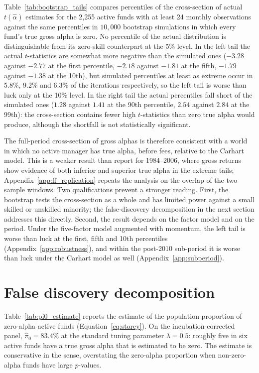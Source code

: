 \documentclass[12pt, oneside]{report}
\begin{document}
\noindent Table~\ref{tab:bootstrap_tails} compares percentiles of the
cross-section of actual $t(\hat{\alpha})$ estimates for the 2{,}255 active
funds with at least 24 monthly observations against the same percentiles
in $10{,}000$ bootstrap simulations in which every fund's true gross
alpha is zero. No percentile of the actual distribution is
distinguishable from its zero-skill counterpart at the 5\% level. In the left tail the
actual $t$-statistics are somewhat more negative than the simulated ones
($-3.28$ against $-2.77$ at the first percentile, $-2.18$ against $-1.81$
at the fifth, $-1.79$ against $-1.38$ at the 10th), but simulated
percentiles at least as extreme occur in 5.8\%, 9.2\% and 6.3\% of the
iterations respectively, so the left tail is worse than luck only at the
10\% level. In the right tail the actual percentiles fall short of the
simulated ones ($1.28$ against $1.41$ at the 90th percentile, $2.54$
against $2.84$ at the 99th): the cross-section contains fewer high
$t$-statistics than zero true alpha would produce, although the
shortfall is not statistically significant.



The full-period cross-section of gross alphas is therefore consistent
with a world in which no active manager has true alpha, before fees,
relative to the Carhart model. This is a weaker result than
\textcite{FamaFrench2010} report for 1984--2006, where gross returns
show evidence of both inferior and superior true alpha in the extreme
tails; Appendix~\ref{app:ff_replication} repeats the analysis on the
overlap of the two sample windows. Two qualifications prevent a stronger reading. First, the
bootstrap tests the cross-section as a whole and has limited power
against a small skilled or unskilled minority; the false-discovery
decomposition in the next section addresses this directly. Second, the
result depends on the factor model and on the period. Under the
\textcite{FamaFrench2015} five-factor model augmented with momentum, the
left tail is worse than luck at the first, fifth and 10th percentiles
(Appendix~\ref{app:robustness}), and within the post-2010 sub-period it
is worse than luck under the Carhart model as well
(Appendix~\ref{app:subperiod}).

\section{False discovery decomposition}
\label{sec:fdr_results}

\noindent Table~\ref{tab:pi0_estimate} reports the \textcite{Storey2002}
estimate of the population proportion of zero-alpha active funds
(Equation~\ref{eq:storey}). On the incubation-corrected panel,
$\hat{\pi}_0 = 83.4\%$ at the standard tuning parameter $\lambda = 0.5$:
roughly five in six active funds have a true gross alpha that is
estimated to be zero. The estimate is conservative in the
\textcite{BarrasScailletWermers2010} sense, overstating the zero-alpha
proportion when non-zero-alpha funds have large $p$-values.
\end{document}
